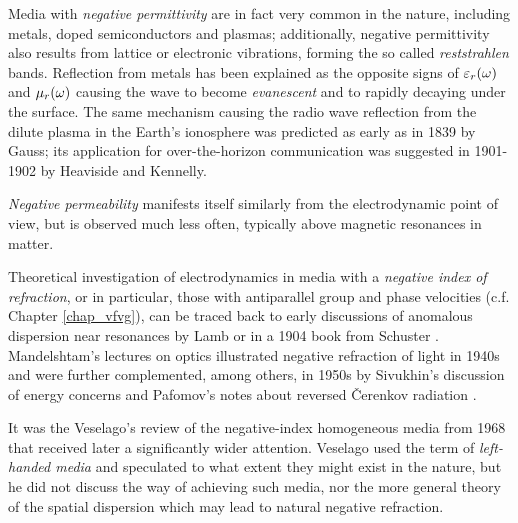 Media with \textit{negative permittivity} are in fact very common in the nature, including metals, doped semiconductors and plasmas; additionally, negative permittivity also results from lattice or electronic vibrations, forming the so called \textit{reststrahlen} bands. Reflection from metals has been explained  %
as the opposite signs of $\varepsilon_r(\omega)$ and $\mu_r(\omega)$ causing the wave to become \textit{evanescent} and to rapidly decaying under the surface. %
The same mechanism causing the radio wave reflection from the dilute plasma in the Earth's ionosphere was predicted as early as in 1839 by Gauss; its application for over-the-horizon communication was suggested in 1901-1902 by Heaviside and Kennelly.

\textit{Negative permeability} manifests itself similarly from the electrodynamic point of view, but is observed much less often, typically above magnetic resonances in matter.

Theoretical investigation of electrodynamics in media with a \textit{negative index of refraction}, or in particular, those with antiparallel group and phase velocities (c.f. Chapter \ref{chap_vfvg}), can be traced back \cite{agranovich2006spatial} to early discussions of anomalous dispersion near resonances by Lamb or in a 1904 book from Schuster \cite{schuster1904introduction, boardman2005negative}. Mandelshtam's lectures on optics illustrated negative refraction of light in 1940s \cite{mandelstam1971lectures} and were further complemented, among others, in 1950s by Sivukhin's discussion of energy concerns \cite{sivukhin1957energy} and Pafomov's notes about reversed \v{C}erenkov radiation \cite{pafomov1956cerenkov}. 

It was the Veselago's review of the negative-index homogeneous media \cite{veselago1968} from 1968 that received later a significantly wider attention. Veselago used %
the term of \textit{left-handed media} and speculated to what extent they might exist in the nature, but he did not discuss the way of achieving such media, nor the more general theory of the spatial dispersion which may lead to natural negative refraction.

